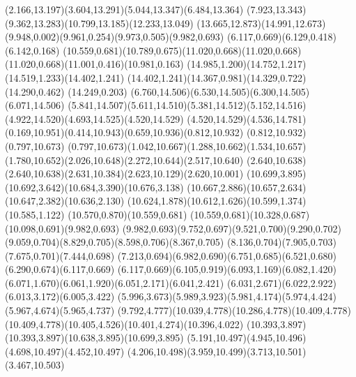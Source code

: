 \documentclass[10pt]{article}
\begin{document}
{{(2.166,13.197)(3.604,13.291)(5.044,13.347)(6.484,13.364)%
(7.923,13.343)(9.362,13.283)(10.799,13.185)(12.233,13.049)%
(13.665,12.873)(14.991,12.673)\relax
{}%
(9.948,0.002)(9.961,0.254)(9.973,0.505)(9.982,0.693)%
\relax
{}(6.117,0.669)(6.129,0.418)(6.142,0.168)\relax
{}(10.559,0.681)(10.789,0.675)(11.020,0.668)(11.020,0.668)%
\relax
{}(11.020,0.668)(11.001,0.416)(10.981,0.163)\relax
{}(14.985,1.200)(14.752,1.217)(14.519,1.233)(14.402,1.241)%
\relax
{}(14.402,1.241)(14.367,0.981)(14.329,0.722)(14.290,0.462)%
(14.249,0.203)\relax
{}(6.760,14.506)(6.530,14.505)(6.300,14.505)(6.071,14.506)%
(5.841,14.507)(5.611,14.510)(5.381,14.512)(5.152,14.516)%
(4.922,14.520)(4.693,14.525)(4.520,14.529)\relax
{}(4.520,14.529)(4.536,14.781)\relax
{}(0.169,10.951)(0.414,10.943)(0.659,10.936)(0.812,10.932)%
\relax
{}(0.812,10.932)(0.797,10.673)\relax
{}(0.797,10.673)(1.042,10.667)(1.288,10.662)(1.534,10.657)%
(1.780,10.652)(2.026,10.648)(2.272,10.644)(2.517,10.640)%
(2.640,10.638)\relax
{}(2.640,10.638)(2.631,10.384)(2.623,10.129)(2.620,10.001)%
\relax
{}(10.699,3.895)(10.692,3.642)(10.684,3.390)(10.676,3.138)%
(10.667,2.886)(10.657,2.634)(10.647,2.382)(10.636,2.130)%
(10.624,1.878)(10.612,1.626)(10.599,1.374)(10.585,1.122)%
(10.570,0.870)(10.559,0.681)\relax
{}(10.559,0.681)(10.328,0.687)(10.098,0.691)(9.982,0.693)%
\relax
{}(9.982,0.693)(9.752,0.697)(9.521,0.700)(9.290,0.702)%
(9.059,0.704)(8.829,0.705)(8.598,0.706)(8.367,0.705)%
(8.136,0.704)(7.905,0.703)(7.675,0.701)(7.444,0.698)%
(7.213,0.694)(6.982,0.690)(6.751,0.685)(6.521,0.680)%
(6.290,0.674)(6.117,0.669)\relax
{}(6.117,0.669)(6.105,0.919)(6.093,1.169)(6.082,1.420)%
(6.071,1.670)(6.061,1.920)(6.051,2.171)(6.041,2.421)%
(6.031,2.671)(6.022,2.922)(6.013,3.172)(6.005,3.422)%
(5.996,3.673)(5.989,3.923)(5.981,4.174)(5.974,4.424)%
(5.967,4.674)(5.965,4.737)\relax
{}(9.792,4.777)(10.039,4.778)(10.286,4.778)(10.409,4.778)%
\relax
{}(10.409,4.778)(10.405,4.526)(10.401,4.274)(10.396,4.022)%
(10.393,3.897)\relax
{}(10.393,3.897)(10.638,3.895)(10.699,3.895)\relax
{}(5.191,10.497)(4.945,10.496)(4.698,10.497)(4.452,10.497)%
(4.206,10.498)(3.959,10.499)(3.713,10.501)(3.467,10.503)%
}}
\end{document}
